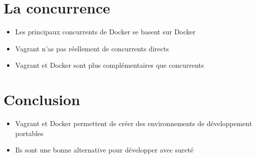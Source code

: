 \documentclass{beamer}
\begin{document}
    


    \section{La concurrence}
    \begin{frame}
       \begin{itemize}
          \item{Les principaux concurrents de Docker se basent sur Docker}
          \item{Vagrant n'as pas réellement de concurrents directs}
          \item{Vagrant et Docker sont plus complémentaires que concurrents}
       \end{itemize}
    \end{frame}



    \section{Conclusion}
    \begin{frame}
       \begin{itemize}
          \item{Vagrant et Docker permettent de créer des environnements de développement portables}
          \item{Ils sont une bonne alternative pour développer avec sureté}
       \end{itemize}
    \end{frame}
\end{document}
